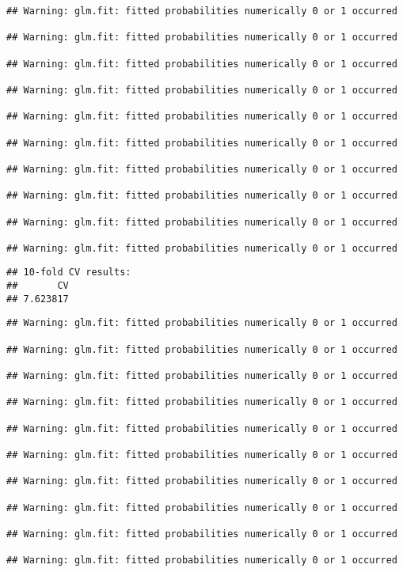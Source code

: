 \documentclass[
]{article}
\newenvironment{Shaded}{\begin{snugshade}}{\end{snugshade}}
\newcommand{\AttributeTok}[1]{\textcolor[rgb]{0.77,0.63,0.00}{#1}}
\newcommand{\DecValTok}[1]{\textcolor[rgb]{0.00,0.00,0.81}{#1}}
\newcommand{\FunctionTok}[1]{\textcolor[rgb]{0.00,0.00,0.00}{#1}}
\newcommand{\NormalTok}[1]{#1}
\newcommand{\SpecialCharTok}[1]{\textcolor[rgb]{0.00,0.00,0.00}{#1}}
\begin{document}
\begin{verbatim}
## Warning: glm.fit: fitted probabilities numerically 0 or 1 occurred

## Warning: glm.fit: fitted probabilities numerically 0 or 1 occurred

## Warning: glm.fit: fitted probabilities numerically 0 or 1 occurred

## Warning: glm.fit: fitted probabilities numerically 0 or 1 occurred

## Warning: glm.fit: fitted probabilities numerically 0 or 1 occurred

## Warning: glm.fit: fitted probabilities numerically 0 or 1 occurred

## Warning: glm.fit: fitted probabilities numerically 0 or 1 occurred

## Warning: glm.fit: fitted probabilities numerically 0 or 1 occurred

## Warning: glm.fit: fitted probabilities numerically 0 or 1 occurred

## Warning: glm.fit: fitted probabilities numerically 0 or 1 occurred
\end{verbatim}

\begin{verbatim}
## 10-fold CV results:
##       CV 
## 7.623817
\end{verbatim}

\begin{Shaded}
\end{Shaded}

\begin{verbatim}
## Warning: glm.fit: fitted probabilities numerically 0 or 1 occurred

## Warning: glm.fit: fitted probabilities numerically 0 or 1 occurred

## Warning: glm.fit: fitted probabilities numerically 0 or 1 occurred

## Warning: glm.fit: fitted probabilities numerically 0 or 1 occurred

## Warning: glm.fit: fitted probabilities numerically 0 or 1 occurred

## Warning: glm.fit: fitted probabilities numerically 0 or 1 occurred

## Warning: glm.fit: fitted probabilities numerically 0 or 1 occurred

## Warning: glm.fit: fitted probabilities numerically 0 or 1 occurred

## Warning: glm.fit: fitted probabilities numerically 0 or 1 occurred

## Warning: glm.fit: fitted probabilities numerically 0 or 1 occurred
\end{verbatim}
\end{document}
